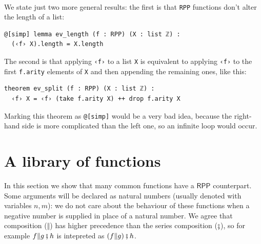 \documentclass{book}
\theoremstyle{definition}
\theoremstyle{remark}
\theoremstyle{plain}
\newcommand{\RPP}{\mathsf{RPP}}
\newcommand{\rppCo}{\fatsemi}
\newcommand{\rppPa}{\Vert}
\begin{document}
\paragraph{}

We state just two more general results:
the first is that \lstinline{RPP} functions don't alter the length of a list:
\begin{lstlisting}
@[simp] lemma ev_length (f : RPP) (X : list ℤ) :
  (‹f› X).length = X.length
\end{lstlisting}
The second is that applying \lstinline{‹f›} to a list \lstinline{X}
is equivalent to applying \lstinline{‹f›} to the first \lstinline{f.arity} elements of \lstinline{X}
and then appending the remaining ones, like this:
\begin{lstlisting}
theorem ev_split (f : RPP) (X : list ℤ) :
  ‹f› X = ‹f› (take f.arity X) ++ drop f.arity X
\end{lstlisting}
Marking this theorem as \lstinline{@[simp]} would be a very bad idea,
because the right-hand side is more complicated than the left one,
so an infinite loop would occur.

\section{A library of functions}

In this section we show that many common functions have a $\RPP$ counterpart.
Some arguments will be declared as natural numbers (usually denoted with variables $n, m$):
we do not care about the behaviour of these functions when a negative number is supplied in place of a natural number.
We agree that composition ($\rppPa$) has higher precedence than the series composition ($\rppCo$),
so for example $f \rppPa g \rppCo h$ is intepreted as $(f \rppPa g) \rppCo h$.
\end{document}
